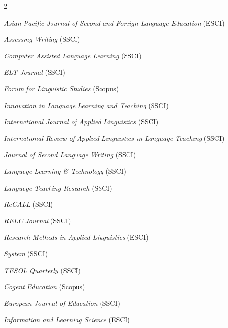 \documentclass[11pt,a4paper]{article}
\begin{document}
\begin{multicols}{2}
\small
\begin{list}{}{\setlength{\leftmargin}{0em}\setlength{\topsep}{0pt}\setlength{\partopsep}{0pt}\setlength{\parskip}{0em}\setlength{\itemsep}{0.03em}\setlength{\parsep}{0em}}
  \item \textit{Asian-Pacific Journal of Second and Foreign Language Education} {\footnotesize\color{black!65}(ESCI)}
  \item \textit{Assessing Writing} {\footnotesize\color{black!65}(SSCI)}
  \item \textit{Computer Assisted Language Learning} {\footnotesize\color{black!65}(SSCI)}
  \item \textit{ELT Journal} {\footnotesize\color{black!65}(SSCI)}
  \item \textit{Forum for Linguistic Studies} {\footnotesize\color{black!65}(Scopus)}
  \item \textit{Innovation in Language Learning and Teaching} {\footnotesize\color{black!65}(SSCI)}
  \item \textit{International Journal of Applied Linguistics} {\footnotesize\color{black!65}(SSCI)}
  \item \textit{International Review of Applied Linguistics in Language Teaching} {\footnotesize\color{black!65}(SSCI)}
  \item \textit{Journal of Second Language Writing} {\footnotesize\color{black!65}(SSCI)}
  \item \textit{Language Learning \& Technology} {\footnotesize\color{black!65}(SSCI)}
  \item \textit{Language Teaching Research} {\footnotesize\color{black!65}(SSCI)}
  \item \textit{ReCALL} {\footnotesize\color{black!65}(SSCI)}
  \item \textit{RELC Journal} {\footnotesize\color{black!65}(SSCI)}
  \item \textit{Research Methods in Applied Linguistics} {\footnotesize\color{black!65}(ESCI)}
  \item \textit{System} {\footnotesize\color{black!65}(SSCI)}
  \item \textit{TESOL Quarterly} {\footnotesize\color{black!65}(SSCI)}
  \item \textit{Cogent Education} {\footnotesize\color{black!65}(Scopus)}
  \item \textit{European Journal of Education} {\footnotesize\color{black!65}(SSCI)}
  \item \textit{Information and Learning Science} {\footnotesize\color{black!65}(ESCI)}

\end{list}
\end{multicols}
\end{document}
